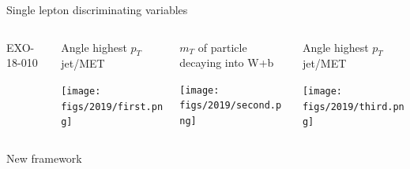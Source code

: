 \documentclass[9pt]{beamer}
\begin{document}
\begin{frame}{\alert{Single lepton} discriminating variables}
\justifying
\begin{columns}
		\hspace{5pt}
		\begin{column}{0.05\textwidth}
		\vspace{10pt}
			\begin{block}{ {EXO-18-010}}\end{block}		
		\end{column} \hfill
		\begin{column}{0.32\textwidth}
			\begin{center}
				\begin{block}{\centering Angle highest $p_T$ jet/MET}\end{block}	
     			\texttt{[image: figs/2019/first.png]}
    		\end{center}		
		\end{column} \hfill
		\begin{column}{0.32\textwidth}
			\begin{center}
				\begin{block}{\centering $m_T$ of particle decaying into W+b}\end{block}	
     			\texttt{[image: figs/2019/second.png]}
    		\end{center}		
		\end{column} \hfill
		\begin{column}{0.32\textwidth}
			\begin{center}
				\begin{block}{\centering Angle highest $p_T$ jet/MET}\end{block}	
     			\texttt{[image: figs/2019/third.png]}
   			 \end{center}
		\end{column} \hfill
	\end{columns} \vspace{-5pt}
	\begin{columns}
		\hspace{5pt}
		\begin{column}{0.05\textwidth}
			\begin{block}{ {New framework}}\end{block}	

\end{column}
\end{columns}
\end{frame}
\end{document}
